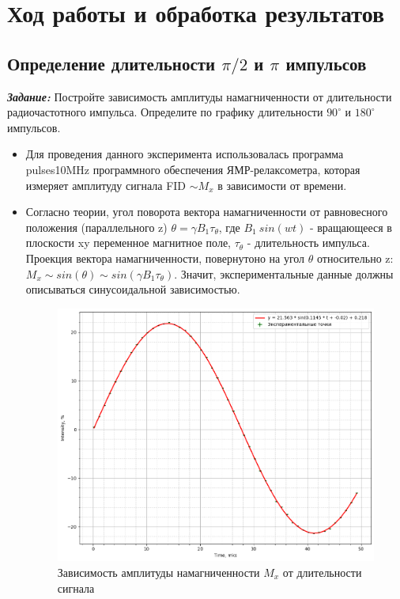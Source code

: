 \documentclass{article}
\begin{document}
\newpage

\section{Ход работы и обработка результатов}

\subsection{Определение длительности $\pi/2$ и $\pi$ импульсов}

\textbf{\textit{Задание:}} Постройте зависимость амплитуды намагниченности от длительности радиочастотного импульса. Определите по графику длительности $90^\circ$ и $180^\circ$ импульсов.

\begin{itemize}


 \item Для проведения данного эксперимента использовалась программа pulses10MHz программного обеспечения ЯМР-релаксометра, которая измеряет амплитуду сигнала FID $\sim M_x$ в зависимости от времени.

  \item  Согласно теории, угол поворота вектора намагниченности от равновесного положения (параллельного z) $\theta=\gamma B_1 \tau_\theta$, где $B_1 ~ sin(wt)$ - вращающееся в плоскости xy переменное магнитное поле, $\tau_\theta$ - длительность импульса. Проекция вектора намагниченности, повернутоно на угол $\theta$ относительно z: $M_x \sim sin(\theta) \sim sin(\gamma B_1 \tau_\theta)$. Значит, экспериментальные данные должны описываться синусоидальной зависимостью.

\begin{figure}[h!]
    \centering
    \includegraphics[scale = 0.4]{graphs/sin.png}
    \caption{Зависимость амплитуды намагниченности $M_x$ от длительности сигнала}
    \label{sin}
\end{figure}


\end{itemize}
\end{document}
